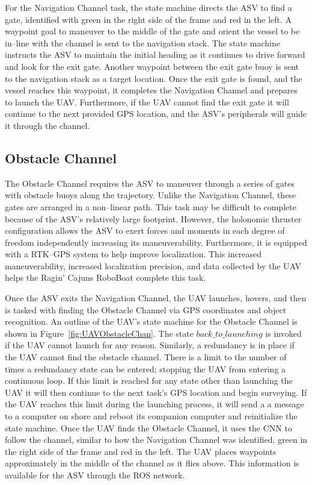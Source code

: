 \documentclass[letterpaper, 12 pt, conference]{ieeeconf}
\begin{document}
For the Navigation Channel task, the state machine directs the ASV to find a gate, identified with green in the right side of the frame and red in the left. A waypoint goal to maneuver to the middle of the gate and orient the vessel to be in--line with the channel is sent to the navigation stack. The state machine instructs the ASV to maintain the initial heading as it continues to drive forward and look for the exit gate. Another waypoint between the exit gate buoy is sent to the navigation stack as a target location. Once the exit gate is found, and the vessel reaches this waypoint, it completes the Navigation Channel and prepares to launch the UAV. Furthermore, if the UAV cannot find the exit gate it will continue to the next provided GPS location, and the ASV's peripherals will guide it through the channel. 
\subsection{Obstacle Channel}
\label{ObstacleChannel}
% 
The Obstacle Channel requires the ASV to maneuver through a series of gates with obstacle buoys along the trajectory. Unlike the Navigation Channel, these gates are arranged in a non--linear path. This task may be difficult to complete because of the ASV's relatively large footprint. However, the holonomic thruster configuration allows the ASV to exert forces and moments in each degree of freedom independently increasing its maneuverability. Furthermore, it is equipped with a RTK--GPS system to help improve localization. This increased maneuverability, increased localization precision, and data collected by the UAV helps the Ragin' Cajuns RoboBoat complete this task.

Once the ASV exits the Navigation Channel, the UAV launches, hovers, and then is tasked with finding the Obstacle Channel via GPS coordinates and object recognition. An outline of the UAV's state machine for the Obstacle Channel is shown in Figure~\ref{fig:UAVObstacleChan}. The state $back\_to\_launching$ is invoked if the UAV cannot launch for any reason. Similarly, a redundancy is in place if the UAV cannot find the obstacle channel. There is a limit to the number of times a redundancy state can be entered; stopping the UAV from entering a continuous loop. If this limit is reached for any state other than launching the UAV it will then continue to the next task's GPS location and begin surveying. If the UAV reaches this limit during the launching process, it will send a a message to a computer on shore and reboot its companion computer and reinitialize the state machine. Once the UAV finds the Obstacle Channel, it uses the CNN to follow the channel, similar to how the Navigation Channel was identified, green in the right side of the frame and red in the left. The UAV places waypoints approximately in the middle of the channel as it flies above. This information is available for the ASV through the ROS network. 
\end{document}
